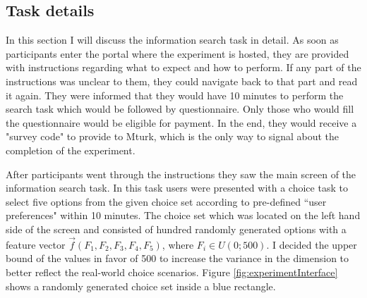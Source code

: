 \documentclass[a4paper,12pt]{article}
\begin{document}
\subsection{Task details}

In this section I will discuss the information search task in detail. As soon as participants enter the portal where the experiment is hosted, they are provided with instructions regarding what to expect and how to perform. If any part of the instructions was unclear to them, they could navigate back to that part and read it again. They were informed that they would have 10 minutes to perform the search task which would be followed by questionnaire. Only those who would fill the questionnaire would be eligible for payment. In the end, they would receive a "survey code" to provide to Mturk, which is the only way to signal about the completion of the experiment. 

After participants went through the instructions they saw the main screen of the information search task. In this task users were presented with a choice task to select five options from the given choice set according to pre-defined ``user preferences" within 10 minutes. The choice set which was located on the left hand side of the screen and consisted of hundred randomly generated options with a feature vector $\vec f(F_1, F_2, F_3, F_4, F_5)$, where $ F_i \in U(0; 500)$. I decided the upper bound of the values in favor of 500 to increase the variance in the dimension to better reflect the real-world choice scenarios. Figure \ref{fig:experimentInterface} shows a randomly generated choice set inside a blue rectangle.
\end{document}
